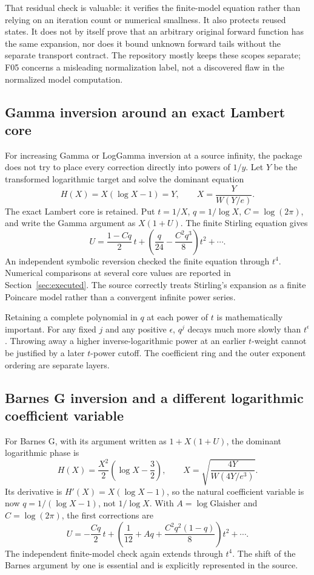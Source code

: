\documentclass[11pt,a4paper]{article}
\theoremstyle{definition}
\begin{document}
That residual check is valuable: it verifies the finite-model equation rather than relying on an iteration count or numerical smallness. It also protects reused states. It does not by itself prove that an arbitrary original forward function has the same expansion, nor does it bound unknown forward tails without the separate transport contract. The repository mostly keeps these scopes separate; F05 concerns a misleading normalization label, not a discovered flaw in the normalized model computation.

\subsection{Gamma inversion around an exact Lambert core}

For increasing Gamma or LogGamma inversion at a source infinity, the package does not try to place every correction directly into powers of $1/y$. Let $Y$ be the transformed logarithmic target and solve the dominant equation
\[
 H(X)=X(\log X-1)=Y,
 \qquad X=\frac{Y}{W(Y/e)}.
\]
The exact Lambert core is retained. Put $t=1/X$, $q=1/\log X$, $C=\log(2\pi)$, and write the Gamma argument as $X(1+U)$. The finite Stirling equation gives
\begin{equation}
 U=\frac{1-Cq}{2}\,t+
   \left(\frac q{24}-\frac{C^2q^3}{8}\right)t^2+\cdots.
 \label{eq:gamma-unit}
\end{equation}
An independent symbolic reversion checked the finite equation through $t^4$. Numerical comparisons at several core values are reported in Section~\ref{sec:executed}. The source correctly treats Stirling's expansion as a finite Poincare model rather than a convergent infinite power series.\cite{gammainverse,dlmf-gamma}

Retaining a complete polynomial in $q$ at each power of $t$ is mathematically important. For any fixed $j$ and any positive $\epsilon$, $q^j$ decays much more slowly than $t^\epsilon$. Throwing away a higher inverse-logarithmic power at an earlier $t$-weight cannot be justified by a later $t$-power cutoff. The coefficient ring and the outer exponent ordering are separate layers.

\subsection{Barnes G inversion and a different logarithmic coefficient variable}

For Barnes G, with its argument written as $1+X(1+U)$, the dominant logarithmic phase is
\[
 H(X)=\frac{X^2}{2}\left(\log X-\frac32\right),
 \qquad
 X=\sqrt{\frac{4Y}{W(4Y/e^3)}}.
\]
Its derivative is $H'(X)=X(\log X-1)$, so the natural coefficient variable is now $q=1/(\log X-1)$, not $1/\log X$. With $A=\log\mathrm{Glaisher}$ and $C=\log(2\pi)$, the first corrections are
\begin{equation}
 U=-\frac{Cq}{2}\,t+
 \left(\frac1{12}+Aq+\frac{C^2q^2(1-q)}8\right)t^2+\cdots.
 \label{eq:barnes-unit}
\end{equation}
The independent finite-model check again extends through $t^4$. The shift of the Barnes argument by one is essential and is explicitly represented in the source.\cite{barnesinverse,gammainverse,dlmf-barnes}
\end{document}
